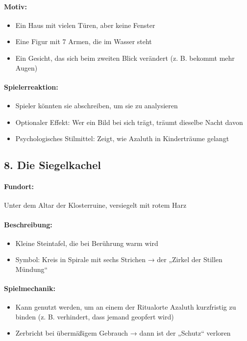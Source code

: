 \paragraph{Motiv:}
\begin{itemize}
\item Ein Haus mit vielen Türen, aber keine Fenster
\item Eine Figur mit 7 Armen, die im Wasser steht
\item Ein Gesicht, das sich beim zweiten Blick verändert (z. B. bekommt mehr Augen)
\end{itemize}
\paragraph{Spielerreaktion:}
\begin{itemize}
\item Spieler könnten sie abschreiben, um sie zu analysieren
\item Optionaler Effekt: Wer ein Bild bei sich trägt, träumt dieselbe Nacht davon
\item Psychologisches Stilmittel: Zeigt, wie Azaluth in Kinderträume gelangt
\end{itemize}

\subsection*{8. Die Siegelkachel}
\paragraph{Fundort:} Unter dem Altar der Klosterruine, versiegelt mit rotem Harz
\paragraph{Beschreibung:}
\begin{itemize}
\item Kleine Steintafel, die bei Berührung warm wird
\item Symbol: Kreis in Spirale mit sechs Strichen → der „Zirkel der Stillen Mündung“
\end{itemize}
\paragraph{Spielmechanik:}
\begin{itemize}
\item Kann genutzt werden, um an einem der Ritualorte Azaluth kurzfristig zu binden (z. B. verhindert, dass jemand geopfert wird)
\item Zerbricht bei übermäßigem Gebrauch → dann ist der „Schutz“ verloren
\end{itemize}


